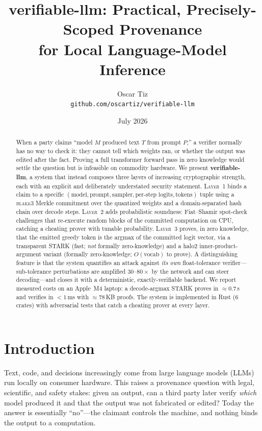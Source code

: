 \documentclass[11pt]{article}
\title{\textbf{verifiable-llm}: Practical, Precisely-Scoped Provenance\\
for Local Language-Model Inference}
\author{Oscar Tiz\\ %
\texttt{github.com/oscartiz/verifiable-llm}}
\date{July 2026}
\newcommand{\layer}[1]{\textsc{#1}}
\begin{document}
\maketitle

\begin{abstract}
When a party claims ``model $M$ produced text $T$ from prompt $P$,'' a verifier
normally has no way to check it: they cannot tell which weights ran, or whether
the output was edited after the fact. Proving a full transformer forward pass in
zero knowledge would settle the question but is infeasible on commodity
hardware. We present \textbf{verifiable-llm}, a system that instead composes
three layers of increasing cryptographic strength, each with an explicit and
deliberately understated security statement. \layer{Layer~1} binds a claim to a
specific $(\text{model}, \text{prompt}, \text{sampler}, \text{per-step logits},
\text{tokens})$ tuple using a \textsc{blake3} Merkle commitment over the
quantized weights and a domain-separated hash chain over decode steps.
\layer{Layer~2} adds probabilistic soundness: Fiat--Shamir spot-check challenges
that re-execute random blocks of the committed computation on CPU, catching a
cheating prover with tunable probability. \layer{Layer~3} proves, in zero
knowledge, that the emitted greedy token is the argmax of the committed logit
vector, via a transparent STARK (fast; \emph{not} formally zero-knowledge) and a
halo2 inner-product-argument variant (formally zero-knowledge; $O(\text{vocab})$
to prove). A distinguishing feature is that the system quantifies an attack
against \emph{its own} float-tolerance verifier---sub-tolerance perturbations are
amplified $30$--$80\times$ by the network and can steer decoding---and closes it
with a deterministic, exactly-verifiable backend. We report measured costs on an
Apple~M4 laptop: a decode-argmax STARK proves in ${\approx}0.7$\,s and verifies
in ${<}1$\,ms with ${\approx}78$\,KB proofs. The system is implemented in Rust
($6$ crates) with adversarial tests that catch a cheating prover at every layer.
\end{abstract}

\section{Introduction}

Text, code, and decisions increasingly come from large language models (LLMs)
run locally on consumer hardware. This raises a provenance question with legal,
scientific, and safety stakes: given an output, can a third party later verify
\emph{which} model produced it and that the output was not fabricated or edited?
Today the answer is essentially ``no''---the claimant controls the machine, and
nothing binds the output to a computation.
\end{document}
